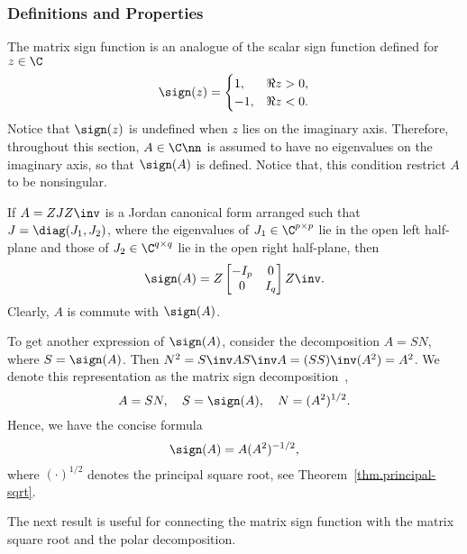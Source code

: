 \subsubsection{Definitions and Properties}
The matrix sign function is an analogue of the scalar sign function defined
for $z\in\C$
\begin{equation}\notag
  \sign(z) =
  \begin{cases}
    1, & \Re z > 0, \\ -1, & \Re z < 0.
  \end{cases}
\end{equation}
Notice that $\sign(z)$ is undefined when $z$ lies on the imaginary axis.
Therefore, throughout this section, $A\in\C\nn$ is assumed to have no
eigenvalues on the imaginary axis, so that $\sign(A)$ is defined. Notice
that, this condition restrict $A$ to be nonsingular.

If $A = ZJZ\inv$ is a Jordan canonical form arranged such that
$J = \diag(J_{1},J_{2})$, where the eigenvalues of $J_{1}\in\C^{p\times p}$
lie in the open left half-plane and those of $J_{2} \in \C^{q\times q}$ lie
in the open right half-plane, then
\begin{equation}\notag
  \sign(A) = Z
  \begin{bmatrix}
    -I_{p} & 0 \\ 0 & I_{q}
  \end{bmatrix}
  Z\inv. 
\end{equation}
Clearly, $A$ is commute with $\sign(A)$.

To get another expression of $\sign(A)$, consider the decomposition
$A = SN$, where $S = \sign(A)$. Then
$N^{2} = S\inv A S\inv A = (SS)\inv(A^{2}) = A^{2}$. We denote this
representation as the matrix sign decomposition~,
\begin{equation}\notag
  A = SN, \quad S = \sign(A),\quad N = (A^{2})^{1/2}.
\end{equation}
Hence, we have the concise formula
\begin{equation}\notag
  \sign(A) = A(A^{2})^{-1/2},
\end{equation}
where $(\cdot)^{1/2}$ denotes the principal square root, see
Theorem~\ref{thm.principal-sqrt}.

The next result is useful for connecting the matrix sign function with the
matrix square root and the polar decomposition.

